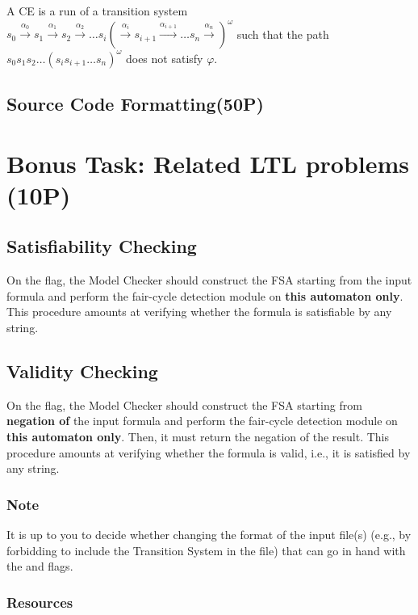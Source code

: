 \documentclass{article}
\begin{document}
A CE is a run of a transition system $s_0 \xrightarrow[]{\alpha_0} s_1 \xrightarrow[]{\alpha_1} s_2 \xrightarrow[]{\alpha_2} \dots s_i (\xrightarrow[]{\alpha_i} s_{i+1} \xrightarrow[]{\alpha_{i+1}} \dots s_n \xrightarrow[]{\alpha_n})^{\omega}$ such 
that the path $s_0s_1s_2 \dots (s_is_{i+1} \dots s_n )^{\omega}$ does not satisfy $\varphi$.

\subsection{Source Code Formatting(50P)}

\section{Bonus Task: Related LTL problems (10P)}

\subsection{Satisfiability Checking}
On the  flag, the Model Checker should construct the FSA starting from the input formula
and perform the fair-cycle detection module on \textbf{this automaton only}. 
This procedure amounts at verifying whether the formula is satisfiable by any string. 

\subsection{Validity Checking}
On the  flag, the Model Checker should construct the FSA starting from \textbf{negation of} 
the input formula and perform the fair-cycle detection module on \textbf{this automaton only}. 
Then, it must return the negation of the result.
This procedure amounts at verifying whether the formula is valid, i.e., it is satisfied by any string. 

\subsubsection*{Note}
It is up to you to decide whether changing the format of the input file(s)
(e.g., by forbidding to include the Transition System in the file) 
that can go in hand with the  and  flags.

\subsubsection*{Resources}
\cite[Paragraph 5.2.2]{BaKa}
\end{document}
